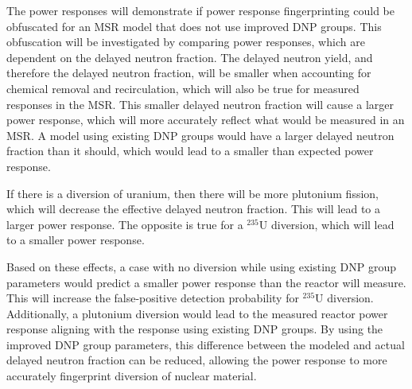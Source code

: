 The power responses will demonstrate if power response fingerprinting could be obfuscated for an \gls{MSR} model that does not use improved \gls{DNP} groups.
This obfuscation will be investigated by comparing power responses, which are dependent on the delayed neutron fraction.
The delayed neutron yield, and therefore the delayed neutron fraction, will be smaller when accounting for chemical removal and recirculation, which will also be true for measured responses in the \gls{MSR}.
This smaller delayed neutron fraction will cause a larger power response, which will more accurately reflect what would be measured in an \gls{MSR}.
A model using existing \gls{DNP} groups would have a larger delayed neutron fraction than it should, which would lead to a smaller than expected power response.

If there is a diversion of uranium, then there will be more plutonium fission, which will decrease the effective delayed neutron fraction.
This will lead to a larger power response.
The opposite is true for a $^{235}$U diversion, which will lead to a smaller power response.

Based on these effects, a case with no diversion while using existing \gls{DNP} group parameters would predict a smaller power response than the reactor will measure.
This will increase the false-positive detection probability for $^{235}$U diversion.
Additionally, a plutonium diversion would lead to the measured reactor power response aligning with the response using existing \gls{DNP} groups. 
By using the improved \gls{DNP} group parameters, this difference between the modeled and actual delayed neutron fraction can be reduced, allowing the power response to more accurately fingerprint diversion of nuclear material.


